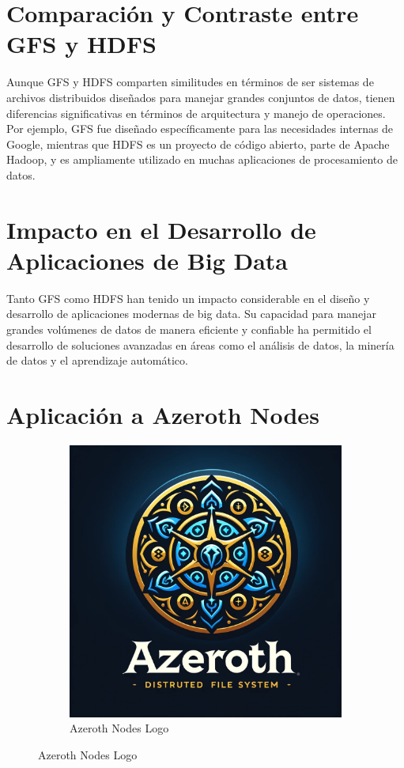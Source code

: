 \section{Comparación y Contraste entre GFS y HDFS}

Aunque GFS y HDFS comparten similitudes en términos de ser sistemas de archivos distribuidos diseñados para manejar grandes conjuntos de datos, tienen diferencias significativas en términos de arquitectura y manejo de operaciones. Por ejemplo, GFS fue diseñado específicamente para las necesidades internas de Google, mientras que HDFS es un proyecto de código abierto, parte de Apache Hadoop, y es ampliamente utilizado en muchas aplicaciones de procesamiento de datos.

\section{Impacto en el Desarrollo de Aplicaciones de Big Data}

Tanto GFS como HDFS han tenido un impacto considerable en el diseño y desarrollo de aplicaciones modernas de big data. Su capacidad para manejar grandes volúmenes de datos de manera eficiente y confiable ha permitido el desarrollo de soluciones avanzadas en áreas como el análisis de datos, la minería de datos y el aprendizaje automático.

\section{Aplicación a Azeroth Nodes}

\begin{figure}[H]
    \centering
    \begin{subfigure}[b]{0.5\textwidth}
        \centering
        \includegraphics[width=\textwidth]{Figures/1. Content/AzerothNodes.png}
        \caption{Azeroth Nodes Logo}
        \label{fig: Azeroth Nodes Logo}
    \end{subfigure}
    \hfill
\end{figure}

